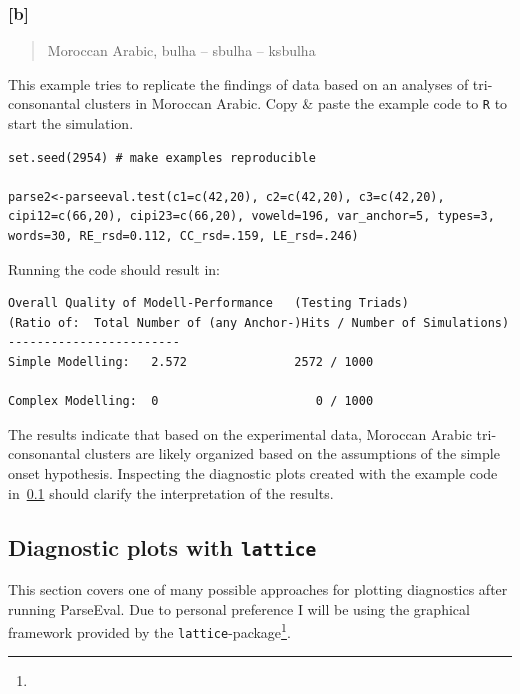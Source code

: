 \documentclass[
draft=false,
toc=graduated,
listof=totoc,
headsepline=true,
]%
{scrartcl}
\begin{document}
\subsubsection*{[b]}
\begin{center}
\begin{quote}
Moroccan Arabic, bulha -- sbulha -- ksbulha~\parencite{Shaw2009}
\end{quote}
\end{center}
This example tries to replicate the findings of data based on an analyses of tri-con\-so\-nan\-tal clusters in Moroccan Arabic. Copy \& paste the example code to \texttt{R} to start the simulation.
\begin{lstlisting}
set.seed(2954) # make examples reproducible

parse2<-parseeval.test(c1=c(42,20), c2=c(42,20), c3=c(42,20), cipi12=c(66,20), cipi23=c(66,20), voweld=196, var_anchor=5, types=3, words=30, RE_rsd=0.112, CC_rsd=.159, LE_rsd=.246)
\end{lstlisting}
Running the code should result in:
\begin{lstlisting}
Overall Quality of Modell-Performance	(Testing Triads)
(Ratio of:	Total Number of (any Anchor-)Hits / Number of Simulations)
------------------------
Simple Modelling:	2.572				2572 / 1000

Complex Modelling:	0					   0 / 1000
\end{lstlisting}
The results indicate that based on the experimental data, Moroccan Arabic tri-con\-so\-nan\-tal clusters are likely organized based on the assumptions of the simple onset hypothesis. Inspecting the diagnostic plots created with the example code in~\ref{subsec:latt} should clarify the interpretation of the results.
\subsection{Diagnostic plots with \texttt{lattice}}
\label{subsec:latt}
This section covers one of many possible approaches for plotting diagnostics after running ParseEval. Due to personal preference I will be using the graphical framework provided by the \texttt{lattice}-package\footnote{}.
\end{document}
